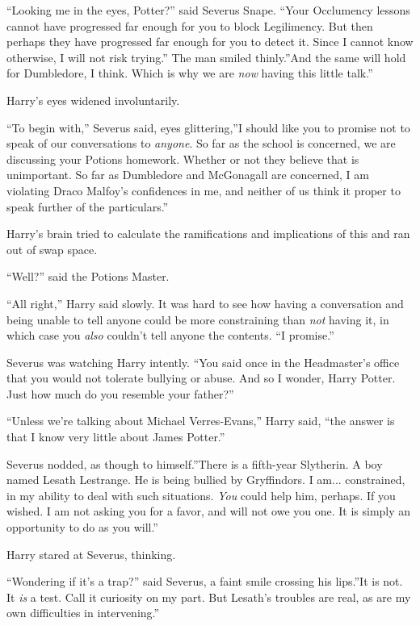 ``Looking me in the eyes, Potter?'' said Severus Snape. ``Your
Occlumency lessons cannot have progressed far enough for you to block
Legilimency. But then perhaps they have progressed far enough for you to
detect it. Since I cannot know otherwise, I will not risk trying.'' The
man smiled thinly.''And the same will hold for Dumbledore, I think.
Which is why we are \emph{now} having this little talk.''

Harry's eyes widened involuntarily.

``To begin with,'' Severus said, eyes glittering,''I should like you to
promise not to speak of our conversations to \emph{anyone}. So far as
the school is concerned, we are discussing your Potions homework.
Whether or not they believe that is unimportant. So far as Dumbledore
and McGonagall are concerned, I am violating Draco Malfoy's confidences
in me, and neither of us think it proper to speak further of the
particulars.''

Harry's brain tried to calculate the ramifications and implications of
this and ran out of swap space.

``Well?'' said the Potions Master.

``All right,'' Harry said slowly. It was hard to see how having a
conversation and being unable to tell anyone could be more constraining
than \emph{not} having it, in which case you \emph{also} couldn't tell
anyone the contents. ``I promise.''

Severus was watching Harry intently. ``You said once in the Headmaster's
office that you would not tolerate bullying or abuse. And so I wonder,
Harry Potter. Just how much do you resemble your father?''

``Unless we're talking about Michael Verres-Evans,'' Harry said, ``the
answer is that I know very little about James Potter.''

Severus nodded, as though to himself.''There is a fifth-year Slytherin.
A boy named Lesath Lestrange. He is being bullied by Gryffindors. I
am... constrained, in my ability to deal with such situations.
\emph{You} could help him, perhaps. If you wished. I am not asking you
for a favor, and will not owe you one. It is simply an opportunity to do
as you will.''

Harry stared at Severus, thinking.

``Wondering if it's a trap?'' said Severus, a faint smile crossing his
lips.''It is not. It \emph{is} a test. Call it curiosity on my part. But
Lesath's troubles are real, as are my own difficulties in intervening.''

